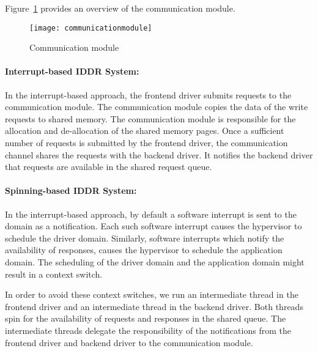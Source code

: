 Figure~\ref{fig:communication} provides an overview of the communication module. 
\begin{figure}[!ht]
\centering
\texttt{[image: communicationmodule]}
\caption{Communication module}
\label{fig:communication}
\end{figure}

\paragraph{Interrupt-based IDDR System:}
\label{par:base IDDR communication}
In the interrupt-based approach, the frontend driver submits requests
to the communication module. The communication module copies the data of
the write requests to shared memory. The communication module is
responsible for the allocation and de-allocation of the shared memory
pages. Once a sufficient number of requests is submitted by the frontend
driver, the communication channel shares the requests with the backend
driver. It notifies the backend driver that requests are available in
the shared request queue.

\paragraph{Spinning-based IDDR System:}
\label{par:spin IDDR communication} In the interrupt-based approach, by
default a software interrupt is sent to the domain as a notification. Each
such software interrupt causes the hypervisor to schedule the driver
domain. Similarly, software interrupts which notify the availability of
responses, causes the hypervisor to schedule the application domain. The
scheduling of the driver domain and the application domain might result
in a context switch.

In order to avoid these context switches, we run an intermediate
thread in the frontend driver and an intermediate thread in the backend
driver. Both threads spin for the availability of requests and responses
in the shared queue. The intermediate threads delegate the responsibility
of the notifications from the frontend driver and backend driver to the
communication module.
